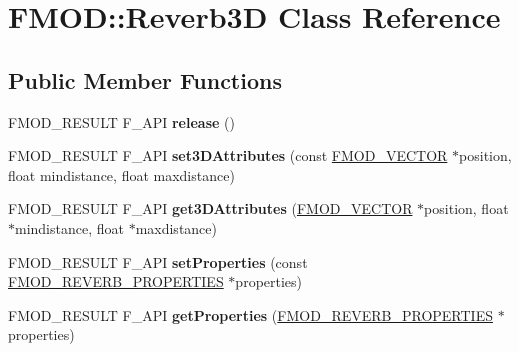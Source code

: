 \hypertarget{classFMOD_1_1Reverb3D}{}\section{F\+M\+OD\+:\+:Reverb3D Class Reference}
\label{classFMOD_1_1Reverb3D}
\subsection*{Public Member Functions}
\begin{DoxyCompactItemize}
\item 
\mbox{\label{classFMOD_1_1Reverb3D_a727b122d300135459a2f1cd59d0d7941}} 
F\+M\+O\+D\+\_\+\+R\+E\+S\+U\+LT F\+\_\+\+A\+PI {\bfseries release} ()
\item 
\mbox{\label{classFMOD_1_1Reverb3D_aaeb05688174876fec05c1f3bc0576be8}} 
F\+M\+O\+D\+\_\+\+R\+E\+S\+U\+LT F\+\_\+\+A\+PI {\bfseries set3\+D\+Attributes} (const \hyperlink{structFMOD__VECTOR}{F\+M\+O\+D\+\_\+\+V\+E\+C\+T\+OR} $\ast$position, float mindistance, float maxdistance)
\item 
\mbox{\label{classFMOD_1_1Reverb3D_a0778c0c504ff5c3d4e5e2b8e66e9c31d}} 
F\+M\+O\+D\+\_\+\+R\+E\+S\+U\+LT F\+\_\+\+A\+PI {\bfseries get3\+D\+Attributes} (\hyperlink{structFMOD__VECTOR}{F\+M\+O\+D\+\_\+\+V\+E\+C\+T\+OR} $\ast$position, float $\ast$mindistance, float $\ast$maxdistance)
\item 
\mbox{\label{classFMOD_1_1Reverb3D_a567c38962a1063fdfa74353b7991ed89}} 
F\+M\+O\+D\+\_\+\+R\+E\+S\+U\+LT F\+\_\+\+A\+PI {\bfseries set\+Properties} (const \hyperlink{structFMOD__REVERB__PROPERTIES}{F\+M\+O\+D\+\_\+\+R\+E\+V\+E\+R\+B\+\_\+\+P\+R\+O\+P\+E\+R\+T\+I\+ES} $\ast$properties)
\item 
\mbox{\label{classFMOD_1_1Reverb3D_a63821bb5d2f34e3f246cb91e49188871}} 
F\+M\+O\+D\+\_\+\+R\+E\+S\+U\+LT F\+\_\+\+A\+PI {\bfseries get\+Properties} (\hyperlink{structFMOD__REVERB__PROPERTIES}{F\+M\+O\+D\+\_\+\+R\+E\+V\+E\+R\+B\+\_\+\+P\+R\+O\+P\+E\+R\+T\+I\+ES} $\ast$properties)
\item 
\mbox{\label{classFMOD_1_1Reverb3D_ad645e360dfba70bf521f7258370a4028}} 

\end{DoxyCompactItemize}
